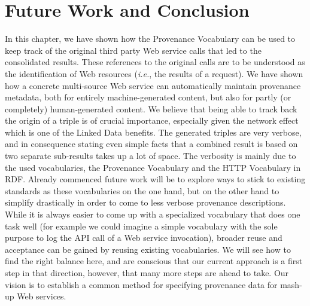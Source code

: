 \section{Future Work and Conclusion}                                                        
\label{sec:conclusion}
In this chapter, we have shown how the Provenance
Vocabulary can be used to keep track of the original third party Web service calls that led to the consolidated
results. These references to the original calls are to be understood as the identification of Web resources (\emph{i.e.}, the
results of a request). We have shown how a concrete multi-source Web service can automatically maintain provenance
metadata, both for entirely machine-generated content, but also for partly (or completely) human-generated content. We
believe that being able to track back the origin of a triple is of crucial importance, especially given the network
effect which is one of the Linked Data benefits. The generated triples are very verbose, and in consequence stating even simple facts that a combined result is based on two separate sub-results takes up a lot of space. The verbosity is mainly due to the used vocabularies, the Provenance Vocabulary and the HTTP Vocabulary in RDF.
Already commenced future work will be to explore ways to stick to existing standards as these vocabularies on the one hand, but on the other hand to simplify drastically in order to come to less verbose provenance descriptions. While it is always easier to come up with a specialized vocabulary that does one task well (for example we could imagine a simple vocabulary with the sole purpose to log the API call of a Web service invocation), broader reuse and acceptance can be gained by reusing existing vocabularies. We will see how to find the right balance here, and are conscious that our current approach is a first step in that direction, however, that many more steps are ahead to take. Our vision is to establish a common method for specifying provenance data for mash-up Web services. 